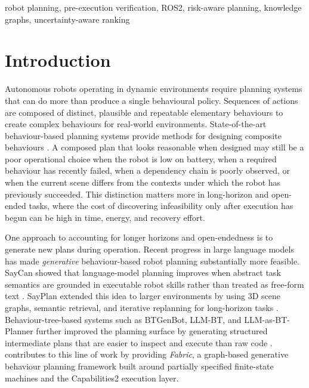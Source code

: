 \documentclass[letterpaper, 10pt, conference]{ieeeconf}
\begin{document}
\begin{keywords}
robot planning, pre-execution verification, ROS2, risk-aware planning, knowledge graphs, uncertainty-aware ranking
\end{keywords}

\section{Introduction}

Autonomous robots operating in dynamic environments require planning systems that can do more than produce a single behavioural policy. Sequences of actions are composed of distinct, plausible and repeatable elementary behaviours to create complex behaviours for real-world environments. State-of-the-art behaviour-based planning systems provide methods for designing composite behaviours \cite{ghzouli_behavior_2023}. A composed plan that looks reasonable when designed may still be a poor operational choice when the robot is low on battery, when a required behaviour has recently failed, when a dependency chain is poorly observed, or when the current scene differs from the contexts under which the robot has previously succeeded. This distinction matters more in long-horizon and open-ended tasks, where the cost of discovering infeasibility only after execution has begun can be high in time, energy, and recovery effort.

One approach to accounting for longer horizons and open-endedness is to generate new plans during operation. Recent progress in large language models has made \textit{generative} behaviour-based robot planning substantially more feasible. SayCan showed that language-model planning improves when abstract task semantics are grounded in executable robot skills rather than treated as free-form text \cite{ahn_as_2022}. SayPlan extended this idea to larger environments by using 3D scene graphs, semantic retrieval, and iterative replanning for long-horizon tasks \cite{rana_sayplan_2023}. Behaviour-tree-based systems such as BTGenBot, LLM-BT, and LLM-as-BT-Planner further improved the planning surface by generating structured intermediate plans that are easier to inspect and execute than raw code \cite{izzo_btgenbot_2024, zhou_llm-bt_2024, ao_llm-as-bt-planner_2025}. \cite{ratnayake2026generativepartiallyspecifiedfinite} contributes to this line of work by providing \textit{Fabric}, a graph-based generative behaviour planning framework built around partially specified finite-state machines and the Capabilities2 execution layer.
\end{document}
